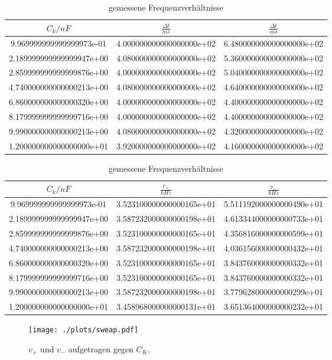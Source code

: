 \begin{table}
  \centering
\caption{gemessene Frequenzverhältnisse}
\label{tab:sweap}
\begin{tabular}{S S S}
  \toprule
  {$C_k/nF$} & {$\frac{\Delta t}{ms}$} & {$\frac{\Delta t}{ms}$}\\
  \midrule
  9.969999999999999973e-01 & 4.000000000000000000e+02 & 6.480000000000000000e+02\\
  2.189999999999999947e+00 & 4.080000000000000000e+02 & 5.360000000000000000e+02\\
  2.859999999999999876e+00 & 4.000000000000000000e+02 & 5.040000000000000000e+02\\
  4.740000000000000213e+00 & 4.080000000000000000e+02 & 4.640000000000000000e+02\\
  6.860000000000000320e+00 & 4.000000000000000000e+02 & 4.400000000000000000e+02\\
  8.179999999999999716e+00 & 4.000000000000000000e+02 & 4.400000000000000000e+02\\
  9.990000000000000213e+00 & 4.080000000000000000e+02 & 4.320000000000000000e+02\\
  1.200000000000000000e+01 & 3.920000000000000000e+02 & 4.160000000000000000e+02\\
\bottomrule
\end{tabular}
\end{table}
\FloatBarrier

\begin{table}
  \centering
\caption{gemessene Frequenzverhältnisse}
\label{tab:sweap}
\begin{tabular}{S S S}
  \toprule
  {$C_k/nF$} & {$\frac{v_+}{kHz}$} & {$\frac{v_-}{kHz}$}\\
  \midrule
  9.969999999999999973e-01 & 3.523100000000000165e+01 & 5.511192000000000490e+01\\
  2.189999999999999947e+00 & 3.587232000000000198e+01 & 4.613344000000000733e+01\\
  2.859999999999999876e+00 & 3.523100000000000165e+01 & 4.356816000000000599e+01\\
  4.740000000000000213e+00 & 3.587232000000000198e+01 & 4.036156000000000432e+01\\
  6.860000000000000320e+00 & 3.523100000000000165e+01 & 3.843760000000000332e+01\\
  8.179999999999999716e+00 & 3.523100000000000165e+01 & 3.843760000000000332e+01\\
  9.990000000000000213e+00 & 3.587232000000000198e+01 & 3.779628000000000299e+01\\
  1.200000000000000000e+01 & 3.458968000000000131e+01 & 3.651364000000000232e+01\\

\bottomrule
\end{tabular}
\end{table}
\FloatBarrier


\begin{figure}
  \centering
  \texttt{[image: ./plots/sweap.pdf]}
  \caption{$v_+$ und $v_-$ aufgetragen gegen $C_K$.}
  \label{fig:sweap}
\end{figure}
\FloatBarrier
